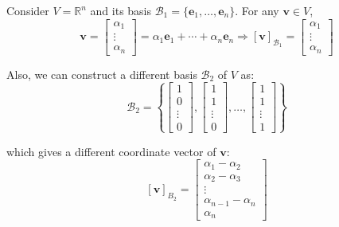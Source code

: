 \begin{example}\label{ex: change-of-basis}
Consider \(V = \mathbb{R}^n\) and its basis \(\mathcal{B}_1 = \{ \mathbf{e}_1, \ldots, \mathbf{e}_n \}\). For any \(\mathbf{v} \in V\),
\[
\mathbf{v} = \begin{bmatrix} \alpha_1 \\ \vdots \\ \alpha_n \end{bmatrix}
= \alpha_1 \mathbf{e}_1 + \cdots + \alpha_n \mathbf{e}_n
\Rightarrow [\mathbf{v}]_{\mathcal{B}_1} = \begin{bmatrix} \alpha_1 \\ \vdots \\ \alpha_n \end{bmatrix}
\]

Also, we can construct a different basis \(\mathcal{B}_2\) of \(V\) as:
\[
\mathcal{B}_2 = \left\{
\begin{bmatrix} 1 \\ 0 \\ \vdots \\ 0 \end{bmatrix},
\begin{bmatrix} 1 \\ 1 \\ \vdots \\ 0 \end{bmatrix},
\ldots,
\begin{bmatrix} 1 \\ 1 \\ \vdots \\ 1 \end{bmatrix}
\right\}
\]

which gives a different coordinate vector of \(\mathbf{v}\):
\[
[\mathbf{v}]_{B_2} =
\begin{bmatrix}
\alpha_1 - \alpha_2 \\
\alpha_2 - \alpha_3 \\
\vdots \\
\alpha_{n-1} - \alpha_n \\
\alpha_n
\end{bmatrix}
\]
\end{example}

